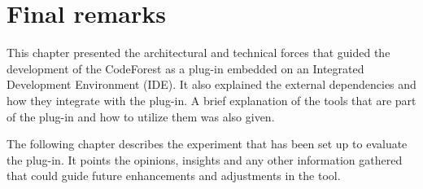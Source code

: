 \section{Final remarks}

This chapter presented the architectural and technical forces that guided the
development of the CodeForest as a plug-in embedded on an Integrated Development
Environment (IDE). It also explained the external dependencies and how they
integrate with the plug-in. A brief explanation of the tools that are part of
the plug-in and how to utilize them was also given.

The following chapter describes the experiment that has been set up to evaluate
the plug-in. It points the opinions, insights and any other information gathered
that could guide future enhancements and adjustments in the tool.